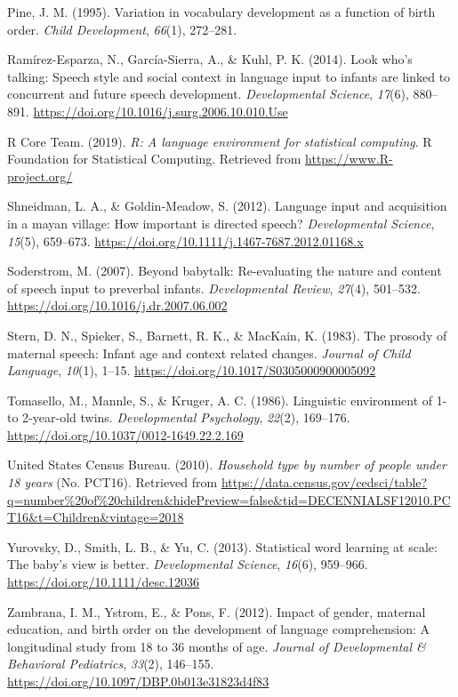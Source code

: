 \documentclass[
  english,
  man,floatsintext]{apa6}
\begin{document}
\leavevmode\hypertarget{ref-pine_variation_1995}{}%
Pine, J. M. (1995). Variation in vocabulary development as a function of birth order. \emph{Child Development}, \emph{66}(1), 272--281.

\leavevmode\hypertarget{ref-ramirez-esparza_look_2014}{}%
Ramírez-Esparza, N., García-Sierra, A., \& Kuhl, P. K. (2014). Look who's talking: Speech style and social context in language input to infants are linked to concurrent and future speech development. \emph{Developmental Science}, \emph{17}(6), 880--891. \url{https://doi.org/10.1016/j.surg.2006.10.010.Use}

\leavevmode\hypertarget{ref-r_core_team_r_2019}{}%
R Core Team. (2019). \emph{R: A language environment for statistical computing}. R Foundation for Statistical Computing. Retrieved from \url{https://www.R-project.org/}

\leavevmode\hypertarget{ref-shneidman_language_2012}{}%
Shneidman, L. A., \& Goldin‐Meadow, S. (2012). Language input and acquisition in a mayan village: How important is directed speech? \emph{Developmental Science}, \emph{15}(5), 659--673. \url{https://doi.org/10.1111/j.1467-7687.2012.01168.x}

\leavevmode\hypertarget{ref-soderstrom_beyond_2007}{}%
Soderstrom, M. (2007). Beyond babytalk: Re-evaluating the nature and content of speech input to preverbal infants. \emph{Developmental Review}, \emph{27}(4), 501--532. \url{https://doi.org/10.1016/j.dr.2007.06.002}

\leavevmode\hypertarget{ref-stern_prosody_1983}{}%
Stern, D. N., Spieker, S., Barnett, R. K., \& MacKain, K. (1983). The prosody of maternal speech: Infant age and context related changes. \emph{Journal of Child Language}, \emph{10}(1), 1--15. \url{https://doi.org/10.1017/S0305000900005092}

\leavevmode\hypertarget{ref-tomasello_linguistic_1986}{}%
Tomasello, M., Mannle, S., \& Kruger, A. C. (1986). Linguistic environment of 1- to 2-year-old twins. \emph{Developmental Psychology}, \emph{22}(2), 169--176. \url{https://doi.org/10.1037/0012-1649.22.2.169}

\leavevmode\hypertarget{ref-united_states_census_bureau_household_2010}{}%
United States Census Bureau. (2010). \emph{Household type by number of people under 18 years} (No. PCT16). Retrieved from \url{https://data.census.gov/cedsci/table?q=number\%20of\%20children\&hidePreview=false\&tid=DECENNIALSF12010.PCT16\&t=Children\&vintage=2018}

\leavevmode\hypertarget{ref-yurovsky_statistical_2013}{}%
Yurovsky, D., Smith, L. B., \& Yu, C. (2013). Statistical word learning at scale: The baby's view is better. \emph{Developmental Science}, \emph{16}(6), 959--966. \url{https://doi.org/10.1111/desc.12036}

\leavevmode\hypertarget{ref-zambrana_impact_2012}{}%
Zambrana, I. M., Ystrom, E., \& Pons, F. (2012). Impact of gender, maternal education, and birth order on the development of language comprehension: A longitudinal study from 18 to 36 months of age. \emph{Journal of Developmental \& Behavioral Pediatrics}, \emph{33}(2), 146--155. \url{https://doi.org/10.1097/DBP.0b013e31823d4f83}

\endgroup
\end{document}

